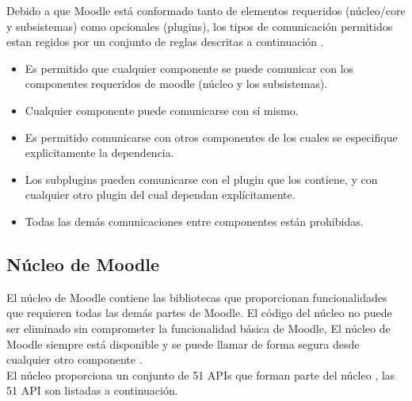     
    
 \noindent Debido a que Moodle está conformado tanto de elementos requeridos (núcleo/core y subsistemas)
 como opcionales (plugins), los tipos de comunicación permitidos estan regidos por un conjunto de reglas
 descritas a continuación \cite{moodleComponets}.

    
    \begin{itemize}
    \item Es permitido que cualquier componente se puede comunicar con los componentes
          requeridos de moodle (núcleo y los subsistemas).

    \item Cualquier componente puede comunicarse con sí mismo.

    \item Es permitido comunicarse con otros componentes de los cuales se especifique
          explicitamente la dependencia.

    \item Los subplugins pueden comunicarse con el plugin que los contiene, y con cualquier
          otro plugin del cual dependan explícitamente.

    \item Todas las demás comunicaciones entre componentes están prohibidas.
    \end{itemize}


\subsection{Núcleo de Moodle}

 El núcleo de Moodle contiene las bibliotecas que proporcionan funcionalidades que requieren todas
 las demás partes de Moodle. El código del núcleo no puede ser eliminado sin comprometer la funcionalidad
 básica de Moodle, El núcleo de Moodle siempre está disponible y se puede llamar de forma segura desde
 cualquier otro componente \cite{moodleComponets}.\\

 \noindent El núcleo proporciona un conjunto de 51 APIs que forman parte del núcleo \cite{moodleCoreAPIs},
 las 51 API son listadas a continuación. %

